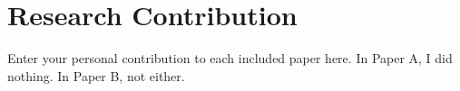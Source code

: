 \thispagestyle{empty}
\section*{Research Contribution}
Enter your personal contribution to each included paper here.
In Paper A, I did nothing.
In Paper B, not either.
